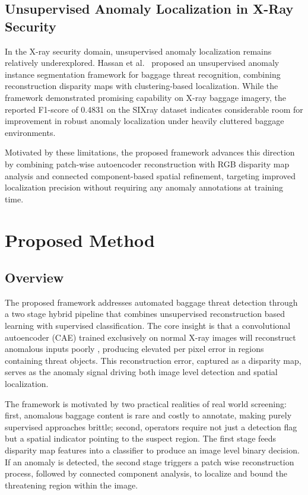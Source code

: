 \documentclass{bmvc2k}
\begin{document}
\subsection{Unsupervised Anomaly Localization in X-Ray Security}

In the X-ray security domain, unsupervised anomaly localization remains relatively 
underexplored. Hassan et al.~\cite{hassan2021unsupervised} proposed an unsupervised 
anomaly instance segmentation framework for baggage threat recognition, combining 
reconstruction disparity maps with clustering-based localization. While the framework 
demonstrated promising capability on X-ray baggage imagery, the reported F1-score 
of 0.4831 on the SIXray dataset indicates considerable room for improvement in robust 
anomaly localization under heavily cluttered baggage environments.

Motivated by these limitations, the proposed framework advances this direction by 
combining patch-wise autoencoder reconstruction with RGB disparity map analysis and 
connected component-based spatial refinement, targeting improved localization precision 
without requiring any anomaly annotations at training time.

\section{Proposed Method}

\subsection{Overview}

The proposed framework addresses automated baggage threat detection through a two stage hybrid pipeline that combines unsupervised reconstruction based learning with supervised classification. The core insight is that a convolutional autoencoder (CAE) trained exclusively on normal X-ray images will reconstruct anomalous inputs poorly \cite{bergmann2019mvtec, akcay2018ganomaly}, producing elevated per pixel error in regions containing threat objects. This reconstruction error, captured as a disparity map, serves as the anomaly signal driving both image level detection and spatial localization.

The framework is motivated by two practical realities of real world screening: first, anomalous baggage content is rare and costly to annotate, making purely supervised approaches brittle; second, operators require not just a detection flag but a spatial indicator pointing to the suspect region. The first stage feeds disparity map features into a classifier to produce an image level binary decision. If an anomaly is detected, the second stage triggers a patch wise reconstruction process, followed by connected component analysis, to localize and bound the threatening region within the image.
\end{document}
